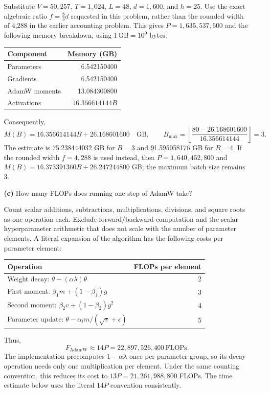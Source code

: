 Substitute $V=50{,}257$, $T=1{,}024$, $L=48$, $d=1{,}600$,
and $h=25$. Use the exact algebraic ratio $f=\frac83d$ requested in this
problem, rather than the rounded width of 4,288 in the earlier accounting
problem. This gives $P=1{,}635{,}537{,}600$ and the following memory breakdown,
using $1\,\mathrm{GB}=10^9$ bytes:
\begin{center}
\begin{tabular}{lr}
\toprule
Component & Memory (GB) \\
\midrule
Parameters & 6.542150400 \\
Gradients & 6.542150400 \\
AdamW moments & 13.084300800 \\
Activations & $16.356614144B$ \\
\bottomrule
\end{tabular}
\end{center}
Consequently,
\[
\boxed{M(B)=16.356614144B+26.168601600\quad\mathrm{GB},}
\qquad
B_{\max}=\left\lfloor\frac{80-26.168601600}{16.356614144}\right\rfloor
=\boxed{3}.
\]
The estimate is 75.238444032 GB for $B=3$ and 91.595058176 GB for $B=4$.
If the rounded width $f=4{,}288$ is used instead, then
$P=1{,}640{,}452{,}800$ and
$M(B)=16.373391360B+26.247244800$ GB; the maximum batch size remains 3.

\textbf{(c)} How many FLOPs does running one step of AdamW take?


Count scalar additions, subtractions, multiplications,
divisions, and square roots as one operation each. Exclude forward/backward
computation and the scalar hyperparameter arithmetic that does not scale
with the number of parameter elements. A literal expansion of the algorithm
has the following costs per parameter element:
\begin{center}
\begin{tabular}{lr}
\toprule
Operation & FLOPs per element \\
\midrule
Weight decay: $\theta-(\alpha\lambda)\theta$ & 2 \\
First moment: $\beta_1m+(1-\beta_1)g$ & 3 \\
Second moment: $\beta_2v+(1-\beta_2)g^2$ & 4 \\
Parameter update: $\theta-\alpha_t m/(\sqrt{v}+\epsilon)$ & 5 \\
\bottomrule
\end{tabular}
\end{center}
Thus,
\[
F_{\mathrm{AdamW}}\approx14P
=\boxed{22{,}897{,}526{,}400\ \mathrm{FLOPs}}.
\]
The implementation precomputes $1-\alpha\lambda$ once per parameter group,
so its decay operation needs only one multiplication per element. Under the
same counting convention, this reduces its cost to
$13P=21{,}261{,}988{,}800$ FLOPs. The time estimate below uses the literal
$14P$ convention consistently.

